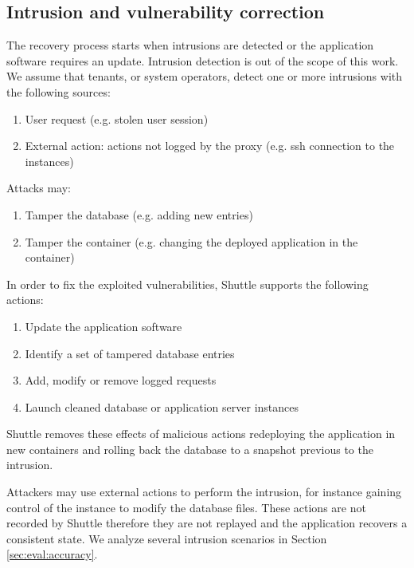 \subsection{Intrusion and vulnerability correction}
\label{sec:arch:detection}
The recovery process starts when intrusions are detected or the application software requires an update. Intrusion detection is out of the scope of this work. We assume that tenants, or system operators, detect one or more intrusions with the following sources:

\begin{enumerate}
\item User request (e.g. stolen user session)
\item External action: actions not logged by the proxy (e.g. ssh connection to the instances)
\end{enumerate}

Attacks may:
\begin{enumerate}
\item Tamper the database (e.g. adding new entries)
\item Tamper the container (e.g. changing the deployed application in the container)
\end{enumerate}

In order to fix the exploited vulnerabilities, Shuttle supports the following actions:
\begin{enumerate}
\item Update the application software
\item Identify a set of tampered database entries
\item Add, modify or remove logged requests
\item Launch cleaned database or application server instances
\end{enumerate} 

Shuttle removes these effects of malicious actions redeploying the application in new containers and rolling back the database to a snapshot previous to the intrusion.

Attackers may use external actions to perform the intrusion, for instance gaining control of the instance to modify the database files. These actions are not recorded by Shuttle therefore they are not replayed and the application recovers a consistent state. We analyze several intrusion scenarios in Section \ref{sec:eval:accuracy}.\\



